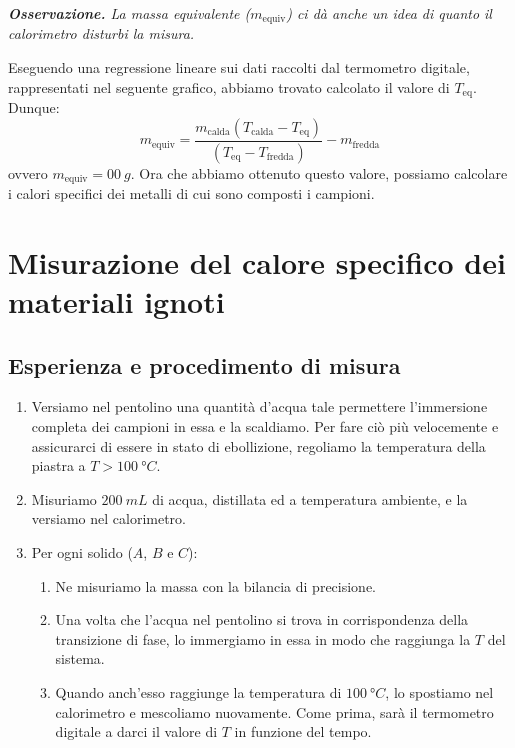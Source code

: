 \documentclass{article}
\begin{document}
    \emph{
        \textbf{Osservazione.} La massa equivalente ($m_\text{equiv}$) ci dà anche un idea di
        quanto il calorimetro disturbi la misura.
        }

Eseguendo una regressione lineare sui dati raccolti dal termometro digitale, rappresentati nel    %
seguente grafico, abbiamo trovato calcolato il valore di $T_\text{eq}$. Dunque:
    \[
        m_\text{equiv} = \frac{m_\text{calda} (T_\text{calda}-T_\text{eq})}{(T_\text{eq}-T_\text{fredda})} - m_\text{fredda}
    \]
ovvero $m_\text{equiv} = \qty{00}{g}$. Ora che abbiamo ottenuto questo valore, possiamo calcolare    %
i calori specifici dei metalli di cui sono composti i campioni.



\section{Misurazione del calore specifico dei materiali ignoti}
    
\subsection{Esperienza e procedimento di misura}

\begin{enumerate}
    \item
        Versiamo nel pentolino una quantità d'acqua tale permettere l'immersione
        completa dei campioni in essa e la scaldiamo. Per fare ciò più velocemente
        e assicurarci di essere in stato di ebollizione, regoliamo la temperatura
        della piastra a $T>\qty{100}{\degree C}$.
    \item
        Misuriamo $\qty{200}{mL}$ di acqua, distillata ed a temperatura ambiente,
        e la versiamo nel calorimetro.
    \item
        Per ogni solido ($A$, $B$ e $C$):
    \begin{enumerate}
        \item
            Ne misuriamo la massa con la bilancia di precisione.
        \item
            Una volta che l'acqua nel pentolino si trova in corrispondenza della
            transizione di fase, lo immergiamo in essa in modo che raggiunga la
            $T$ del sistema.
        \item
            Quando anch'esso raggiunge la temperatura di $\qty{100}{\degree C}$,
            lo spostiamo nel calorimetro e mescoliamo nuovamente. Come prima, sarà
            il termometro digitale a darci il valore di $T$ in funzione del tempo.
    \end{enumerate}
\end{enumerate}
\end{document}
